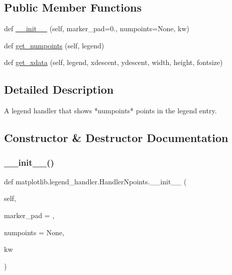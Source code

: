 \subsection*{Public Member Functions}
\begin{DoxyCompactItemize}
\item 
def \hyperlink{classmatplotlib_1_1legend__handler_1_1HandlerNpoints_a449828f04d144be82c569cadad94309e}{\+\_\+\+\_\+init\+\_\+\+\_\+} (self, marker\+\_\+pad=0., numpoints=None, kw)
\item 
def \hyperlink{classmatplotlib_1_1legend__handler_1_1HandlerNpoints_a48c3c1daffc1304cd43cad5a04a24c10}{get\+\_\+numpoints} (self, legend)
\item 
def \hyperlink{classmatplotlib_1_1legend__handler_1_1HandlerNpoints_a7f0416f6dfc68c7209467ce4a30ec5ef}{get\+\_\+xdata} (self, legend, xdescent, ydescent, width, height, fontsize)
\end{DoxyCompactItemize}


\subsection{Detailed Description}
\begin{DoxyVerb}A legend handler that shows *numpoints* points in the legend entry.
\end{DoxyVerb}
 

\subsection{Constructor \& Destructor Documentation}
\mbox{\label{classmatplotlib_1_1legend__handler_1_1HandlerNpoints_a449828f04d144be82c569cadad94309e}} 
\subsubsection{\texorpdfstring{\+\_\+\+\_\+init\+\_\+\+\_\+()}{\_\_init\_\_()}}
{\footnotesize\ttfamily def matplotlib.\+legend\+\_\+handler.\+Handler\+Npoints.\+\_\+\+\_\+init\+\_\+\+\_\+ (\begin{DoxyParamCaption}\item[{}]{self,  }\item[{}]{marker\+\_\+pad = {},  }\item[{}]{numpoints = {\ttfamily None},  }\item[{}]{kw }\end{DoxyParamCaption})}

